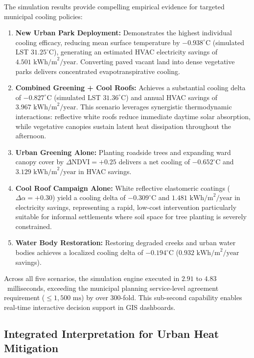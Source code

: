 \documentclass[a4paper,fleqn]{cas-sc}
\begin{document}
The simulation results provide compelling empirical evidence for targeted municipal cooling policies:
\begin{enumerate}[1.]
    \item \textbf{New Urban Park Deployment:} Demonstrates the highest individual cooling efficacy, reducing mean surface temperature by $-0.938^\circ\text{C}$ (simulated LST $31.25^\circ\text{C}$), generating an estimated HVAC electricity savings of $4.501\text{ kWh/m}^2/\text{year}$. Converting paved vacant land into dense vegetative parks delivers concentrated evapotranspirative cooling.
    \item \textbf{Combined Greening + Cool Roofs:} Achieves a substantial cooling delta of $-0.827^\circ\text{C}$ (simulated LST $31.36^\circ\text{C}$) and annual HVAC savings of $3.967\text{ kWh/m}^2/\text{year}$. This scenario leverages synergistic thermodynamic interactions: reflective white roofs reduce immediate daytime solar absorption, while vegetative canopies sustain latent heat dissipation throughout the afternoon.
    \item \textbf{Urban Greening Alone:} Planting roadside trees and expanding ward canopy cover by $\Delta\text{NDVI} = +0.25$ delivers a net cooling of $-0.652^\circ\text{C}$ and $3.129\text{ kWh/m}^2/\text{year}$ in HVAC savings.
    \item \textbf{Cool Roof Campaign Alone:} White reflective elastomeric coatings ($\Delta\alpha = +0.30$) yield a cooling delta of $-0.309^\circ\text{C}$ and $1.481\text{ kWh/m}^2/\text{year}$ in electricity savings, representing a rapid, low-cost intervention particularly suitable for informal settlements where soil space for tree planting is severely constrained.
    \item \textbf{Water Body Restoration:} Restoring degraded creeks and urban water bodies achieves a localized cooling delta of $-0.194^\circ\text{C}$ ($0.932\text{ kWh/m}^2/\text{year}$ savings).
\end{enumerate}

Across all five scenarios, the simulation engine executed in $2.91$ to $4.83$~milliseconds, exceeding the municipal planning service-level agreement requirement ($\le 1,500\text{ ms}$) by over 300-fold. This sub-second capability enables real-time interactive decision support in GIS dashboards.

\subsection{Integrated Interpretation for Urban Heat Mitigation}
\label{subsec:mitigation_discussion}
\end{document}
